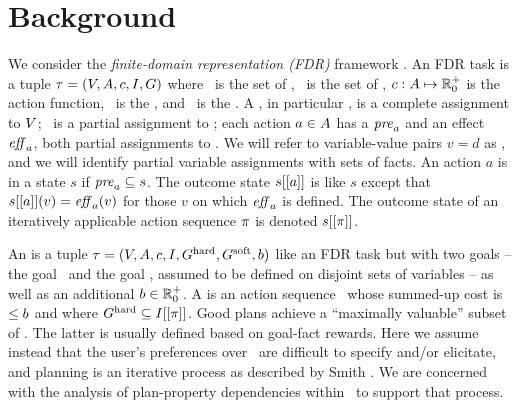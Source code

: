 \section{Background}
\label{background}



We consider the \emph{finite-domain representation (FDR)} framework
\cite{backstrom:nebel:ci-95,helmert:ai-09}.
%
An FDR task  is a tuple $\tau =
(V,A,{c},I,G)$ where \vars\ is the set of
, \acts\ is the set of , ${c}:
A \mapsto {\mathbb{R}}^+_0$ is the action  function,
\init\ is the , and \goal\ is the
. A , in particular \init, is a complete
assignment to $V$; \goal\ is a partial assignment to \vars; each
action $a \in A$ has a  $\mathit{pre}_a$ and an
effect $\mathit{eff}_a$, both partial assignments to \vars. We will refer to
variable-value pairs $v=d$ as , and we will identify
partial variable assignments with sets of facts.
%
An action $a$ is  in a state $s$ if $\mathit{pre}_a
\subseteq s$. The outcome state $s[[a]]$ is like $s$ except that
$s[[a]](v) = \mathit{eff}_a(v)$ for those $v$ on which $\mathit{eff}_a$ is
defined. The outcome state of an iteratively applicable action
sequence $\pi$ is denoted $s[[\pi]]$.

An  is a tuple $\tau =
(V,\allowbreak A,\allowbreak{\ensuremath{c}},\allowbreak I,\allowbreak G^{\text{\textup{hard}}},\allowbreak G^{\text{\textup{soft}}},\allowbreak{\ensuremath{b}})$
like an FDR task but with two goals -- the  goal
\goalhard\ and the  goal \goalsoft, assumed to be
defined on disjoint sets of variables -- as well as an additional
 ${b} \in {\mathbb{R}}^+_0$. A  is
an action sequence \plan\ whose summed-up cost is $\leq {\ensuremath{b}}$
and where $G^{\text{\textup{hard}}} \subseteq I[[\pi]]$. Good plans achieve
a ``maximally valuable'' subset of \goalsoft. The latter is usually
defined based on goal-fact rewards. Here we assume instead that the
user's preferences over \goalsoft\ are difficult to specify and/or
elicitate, and planning is an iterative process as described by Smith
. We are concerned with the analysis of
plan-property dependencies within \goalsoft\ to support that process.

